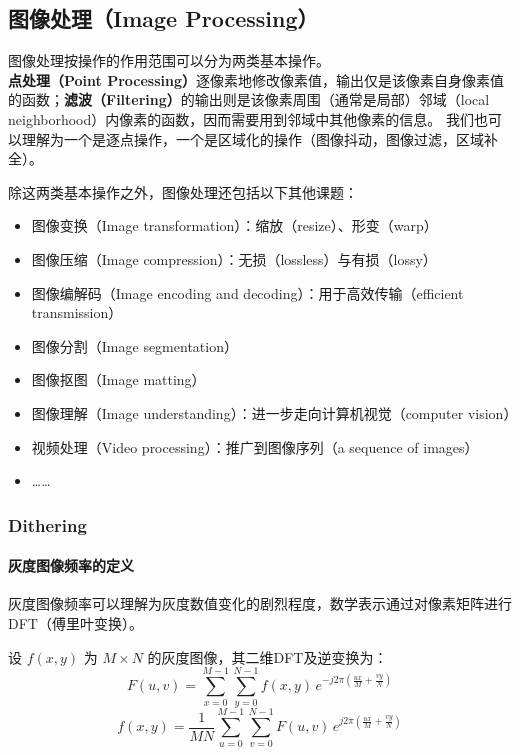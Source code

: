 \documentclass{ctexart}
\theoremstyle{cnthm}
\begin{document}
\subsection{图像处理（Image Processing）}

图像处理按操作的作用范围可以分为两类基本操作。\textbf{点处理（Point Processing）}逐像素地修改像素值，输出仅是该像素自身像素值的函数；\textbf{滤波（Filtering）}的输出则是该像素周围（通常是局部）邻域（local neighborhood）内像素的函数，因而需要用到邻域中其他像素的信息。
我们也可以理解为一个是逐点操作，一个是区域化的操作（图像抖动，图像过滤，区域补全）。

除这两类基本操作之外，图像处理还包括以下其他课题：

\begin{itemize}
    \item 图像变换（Image transformation）：缩放（resize）、形变（warp）
    \item 图像压缩（Image compression）：无损（lossless）与有损（lossy）
    \item 图像编解码（Image encoding and decoding）：用于高效传输（efficient transmission）
    \item 图像分割（Image segmentation）
    \item 图像抠图（Image matting）
    \item 图像理解（Image understanding）：进一步走向计算机视觉（computer vision）
    \item 视频处理（Video processing）：推广到图像序列（a sequence of images）
    \item ……
\end{itemize}

\subsubsection{Dithering}

\paragraph{灰度图像频率的定义}

灰度图像频率可以理解为灰度数值变化的剧烈程度，数学表示通过对像素矩阵进行DFT（傅里叶变换）。

设 $f(x,y)$ 为 $M \times N$ 的灰度图像，其二维DFT及逆变换为：
\[
F(u,v) = \sum_{x=0}^{M-1}\sum_{y=0}^{N-1} f(x,y)\, e^{-j 2\pi \left(\frac{ux}{M} + \frac{vy}{N}\right)}
\]
\[
f(x,y) = \frac{1}{MN}\sum_{u=0}^{M-1}\sum_{v=0}^{N-1} F(u,v)\, e^{j 2\pi \left(\frac{ux}{M} + \frac{vy}{N}\right)}
\]
\end{document}
